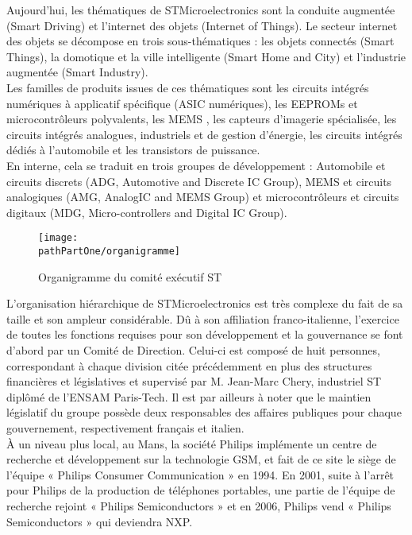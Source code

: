 Aujourd’hui, les thématiques de STMicroelectronics sont la conduite augmentée
(Smart Driving) et l’internet des objets (Internet of Things). Le secteur
internet des objets se décompose en trois sous-thématiques : les objets
connectés (Smart Things), la domotique et la ville intelligente (Smart Home
and City) et l’industrie augmentée (Smart Industry). \\

Les familles de produits issues de ces thématiques sont les circuits intégrés
numériques à applicatif spécifique (ASIC numériques), les EEPROMs et
microcontrôleurs polyvalents, les MEMS , les capteurs d’imagerie spécialisée,
les circuits intégrés analogues, industriels et de gestion d’énergie, les
circuits intégrés dédiés à l’automobile et les transistors de puissance. \\

En interne, cela se traduit en trois groupes de développement : Automobile et
circuits discrets (ADG, Automotive and Discrete IC Group), MEMS et circuits
analogiques (AMG, AnalogIC and MEMS Group) et microcontrôleurs et circuits
digitaux (MDG, Micro-controllers and Digital IC Group). \\

\begin{figure}[H]
    \begin{center}
        \texttt{[image: \\pathPartOne/organigramme]}
        \caption{Organigramme du comité exécutif ST}
        \label{fig:organigramme}
    \end{center}
\end{figure}

L’organisation hiérarchique de STMicroelectronics est très complexe du fait de
sa taille et son ampleur considérable. Dû à son affiliation franco-italienne,
l’exercice de toutes les fonctions requises pour son développement et la
gouvernance se font d’abord par un Comité de Direction. Celui-ci est composé
de huit personnes, correspondant à chaque division citée précédemment en plus
des structures financières et législatives et supervisé par M.  Jean-Marc
Chery, industriel ST diplômé de l'ENSAM Paris-Tech. Il est par ailleurs à
noter que le maintien législatif du groupe possède deux responsables des
affaires publiques pour chaque gouvernement, respectivement français et
italien. \\

À un niveau plus local, au Mans, la société Philips implémente un centre de
recherche et développement sur la technologie GSM, et fait de ce site le siège
de l’équipe « Philips Consumer Communication » en 1994. En 2001, suite à
l’arrêt pour Philips de la production de téléphones portables, une partie de
l’équipe de recherche rejoint « Philips Semiconductors » et en 2006, Philips
vend « Philips Semiconductors » qui deviendra NXP. \\

